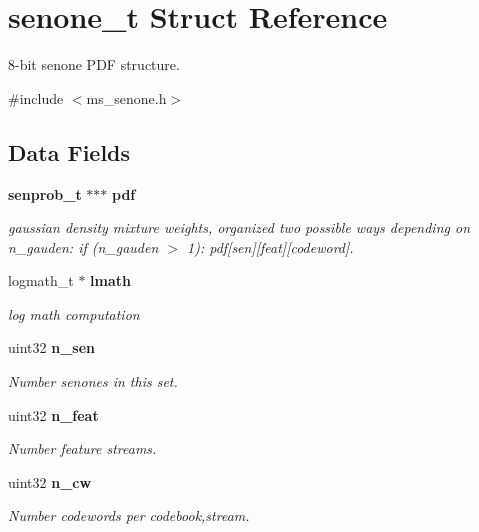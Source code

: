 \section{senone\+\_\+t Struct Reference}
\label{structsenone__t}


8-\/bit senone P\+DF structure.  




{\ttfamily \#include $<$ms\+\_\+senone.\+h$>$}

\subsection*{Data Fields}
\begin{DoxyCompactItemize}
\item 
\textbf{ senprob\+\_\+t} $\ast$$\ast$$\ast$ \textbf{ pdf}
\begin{DoxyCompactList}\small\item\em gaussian density mixture weights, organized two possible ways depending on n\+\_\+gauden\+: if (n\+\_\+gauden $>$ 1)\+: pdf[sen][feat][codeword]. \end{DoxyCompactList}\item 
\mbox{\label{structsenone__t_aa8621fab8c5b7a13493cae5549a5e0de}} 
logmath\+\_\+t $\ast$ \textbf{ lmath}
\begin{DoxyCompactList}\small\item\em log math computation \end{DoxyCompactList}\item 
\mbox{\label{structsenone__t_a769aa6d2fc16b33c0b9a1cbf31592422}} 
uint32 \textbf{ n\+\_\+sen}
\begin{DoxyCompactList}\small\item\em Number senones in this set. \end{DoxyCompactList}\item 
\mbox{\label{structsenone__t_a6a0aa50b8ff66e06f7305d1c8e4a17be}} 
uint32 \textbf{ n\+\_\+feat}
\begin{DoxyCompactList}\small\item\em Number feature streams. \end{DoxyCompactList}\item 
\mbox{\label{structsenone__t_a3c382a37dc9cb650d910bb881c52b336}} 
uint32 \textbf{ n\+\_\+cw}
\begin{DoxyCompactList}\small\item\em Number codewords per codebook,stream. \end{DoxyCompactList}\item 

\end{DoxyCompactItemize}
